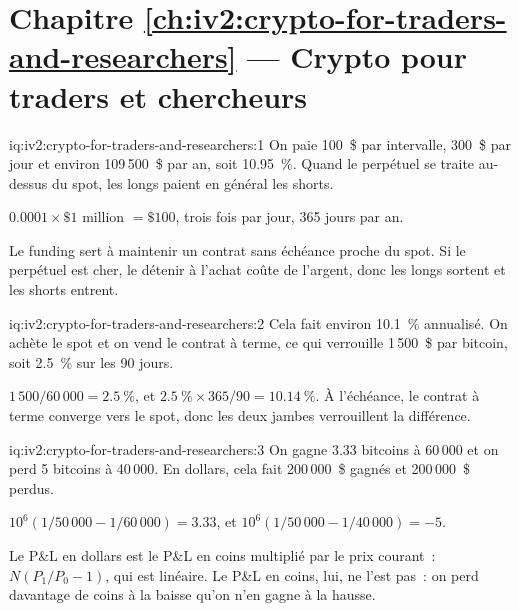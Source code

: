 \section*{Chapitre \ref{ch:iv2:crypto-for-traders-and-researchers} --- Crypto pour traders et chercheurs}

\begin{solution}{iq:iv2:crypto-for-traders-and-researchers:1}
On paie 100~\$ par intervalle, 300~\$ par jour et environ 109\,500~\$ par an, soit 10.95~\%. Quand le perpétuel se traite au-dessus du spot, les longs paient en général les shorts.

$0.0001 \times \$1$ million $= \$100$, trois fois par jour, 365 jours par an.

Le funding sert à maintenir un contrat sans échéance proche du spot. Si le perpétuel est cher, le détenir à l'achat coûte de l'argent, donc les longs sortent et les shorts entrent.

\end{solution}

\begin{solution}{iq:iv2:crypto-for-traders-and-researchers:2}
Cela fait environ 10.1~\% annualisé. On achète le spot et on vend le contrat à terme, ce qui verrouille 1\,500~\$ par bitcoin, soit 2.5~\% sur les 90 jours.

$1\,500/60\,000 = 2.5~\%$, et $2.5~\% \times 365/90 = 10.14~\%$. À l'échéance, le contrat à terme converge vers le spot, donc les deux jambes verrouillent la différence.

\end{solution}

\begin{solution}{iq:iv2:crypto-for-traders-and-researchers:3}
On gagne 3.33 bitcoins à 60\,000 et on perd 5 bitcoins à 40\,000. En dollars, cela fait 200\,000~\$ gagnés et 200\,000~\$ perdus.

$10^6(1/50\,000 - 1/60\,000) = 3.33$, et $10^6(1/50\,000 - 1/40\,000) = -5$.

Le P\&L en dollars est le P\&L en coins multiplié par le prix courant~: $N(P_1/P_0 - 1)$, qui est linéaire. Le P\&L en coins, lui, ne l'est pas~: on perd davantage de coins à la baisse qu'on n'en gagne à la hausse.

\end{solution}

